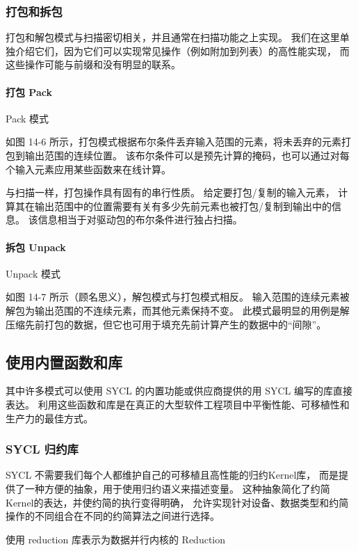 \subsubsection{打包和拆包}
打包和解包模式与扫描密切相关，并且通常在扫描功能之上实现。 
我们在这里单独介绍它们，因为它们可以实现常见操作（例如附加到列表）的高性能实现，
而这些操作可能与前缀和没有明显的联系。

\paragraph{打包 Pack}

{\color{red} Pack 模式}

如图 14-6 所示，打包模式根据布尔条件丢弃输入范围的元素，将未丢弃的元素打包到输出范围的连续位置。 
该布尔条件可以是预先计算的掩码，也可以通过对每个输入元素应用某些函数来在线计算。

与扫描一样，打包操作具有固有的串行性质。 给定要打包/复制的输入元素，
计算其在输出范围中的位置需要有关有多少先前元素也被打包/复制到输出中的信息。 
该信息相当于对驱动包的布尔条件进行独占扫描。

\paragraph{拆包 Unpack}

{\color{red} Unpack 模式}

如图 14-7 所示（顾名思义），解包模式与打包模式相反。 
输入范围的连续元素被解包为输出范围的不连续元素，而其他元素保持不变。 
此模式最明显的用例是解压缩先前打包的数据，但它也可用于填充先前计算产生的数据中的“间隙”。

\subsection{使用内置函数和库}
其中许多模式可以使用 SYCL 的内置功能或供应商提供的用 SYCL 编写的库直接表达。 
利用这些函数和库是在真正的大型软件工程项目中平衡性能、可移植性和生产力的最佳方式。

\subsubsection{SYCL 归约库}
SYCL 不需要我们每个人都维护自己的可移植且高性能的归约Kernel库，
而是提供了一种方便的抽象，用于使用归约语义来描述变量。 
这种抽象简化了约简Kernel的表达，并使约简的执行变得明确，
允许实现针对设备、数据类型和约简操作的不同组合在不同的约简算法之间进行选择。

{\color{red} 使用 reduction 库表示为数据并行内核的 Reduction}

